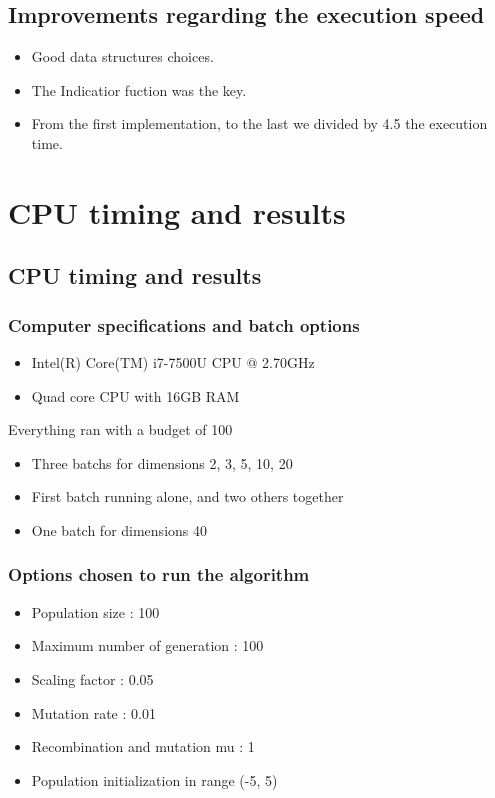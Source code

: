 \documentclass{beamer}
\begin{document}
\subsection{Improvements regarding the execution speed}
\begin{frame}
  \begin{itemize}
    \item Good data structures choices.
    \item The Indicatior fuction was the key.
    \item From the first implementation, to the last we divided by 4.5 the execution time.
  \end{itemize}
 
\end{frame}

\section{CPU timing and results}
\subsection{CPU timing and results}
\begin{frame}
  \frametitle{Computer specifications and batch options}
  \begin{itemize}
  \item Intel(R) Core(TM) i7-7500U CPU @ 2.70GHz
  \item Quad core CPU with 16GB RAM
  \end{itemize}
  \vspace{1em}
  Everything ran with a budget of 100\\
  \begin{itemize}
  \item Three batchs for dimensions 2, 3, 5, 10, 20
  \item First batch running alone, and two others together
  \item One batch for dimensions 40
  \end{itemize}
\end{frame}

\begin{frame}
  \frametitle{Options chosen to run the algorithm}
  \begin{itemize}
  \item Population size : 100
  \item Maximum number of generation : 100
  \item Scaling factor : 0.05
  \item Mutation rate : 0.01
  \item Recombination and mutation mu : 1
  \item Population initialization in range (-5, 5)
  \end{itemize}
\end{frame}
\end{document}

